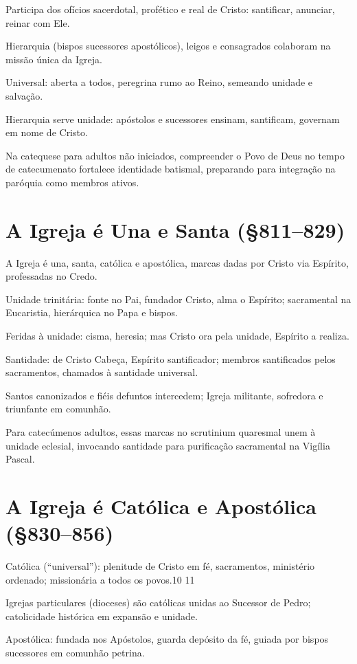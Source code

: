 Participa dos ofícios sacerdotal, profético e real de Cristo: santificar, anunciar, reinar com Ele.

Hierarquia (bispos sucessores apostólicos), leigos e consagrados colaboram na missão única da Igreja.

Universal: aberta a todos, peregrina rumo ao Reino, semeando unidade e salvação.

Hierarquia serve unidade: apóstolos e sucessores ensinam, santificam, governam em nome de Cristo.

Na catequese para adultos não iniciados, compreender o Povo de Deus no tempo de catecumenato fortalece identidade batismal, preparando para integração na paróquia como membros ativos.

\section{A Igreja é Una e Santa (\S 811--829)}

A Igreja é una, santa, católica e apostólica, marcas dadas por Cristo via Espírito, professadas no Credo.

Unidade trinitária: fonte no Pai, fundador Cristo, alma o Espírito; sacramental na Eucaristia, hierárquica no Papa e bispos.

Feridas à unidade: cisma, heresia; mas Cristo ora pela unidade, Espírito a realiza.

Santidade: de Cristo Cabeça, Espírito santificador; membros santificados pelos sacramentos, chamados à santidade universal.

Santos canonizados e fiéis defuntos intercedem; Igreja militante, sofredora e triunfante em comunhão.

Para catecúmenos adultos, essas marcas no scrutinium quaresmal unem à unidade eclesial, invocando santidade para purificação sacramental na Vigília Pascal.

\section{A Igreja é Católica e Apostólica (\S 830--856)}

Católica (``universal''): plenitude de Cristo em fé, sacramentos, ministério ordenado; missionária a todos os povos.10 11

Igrejas particulares (dioceses) são católicas unidas ao Sucessor de Pedro; catolicidade histórica em expansão e unidade.

Apostólica: fundada nos Apóstolos, guarda depósito da fé, guiada por bispos sucessores em comunhão petrina.

